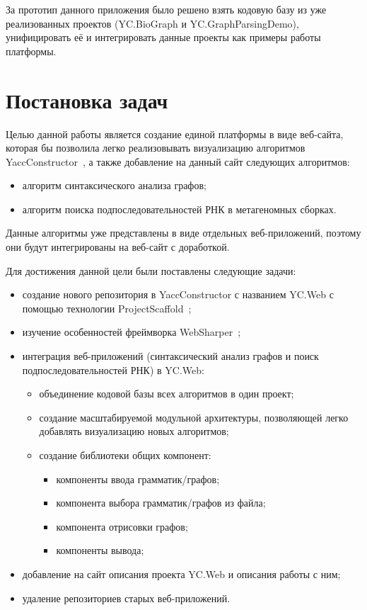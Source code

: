 \documentclass[14pt]{matmex-diploma}
\begin{document}
За прототип данного приложения было решено взять кодовую базу из уже реализованных проектов (YC.BioGraph и YC.GraphParsingDemo), унифицировать её и интегрировать данные проекты как примеры работы платформы.


\section{Постановка задач}
Целью данной работы является создание единой платформы в виде веб-сайта, которая бы позволила легко реализовывать визуализацию алгоритмов YaccConstructor~\cite{yacconstructor}, а также добавление на данный сайт следующих алгоритмов: 

\begin{itemize}
\item алгоритм синтаксического анализа графов; 
\item алгоритм поиска подпоследовательностей РНК в метагеномных сборках. 
\end{itemize}

Данные алгоритмы уже представлены в виде отдельных \linebreak веб-приложений, поэтому они будут интегрированы на веб-сайт с доработкой. 


Для достижения данной цели были поставлены следующие задачи: 
\begin{itemize}
\item создание нового репозитория в YaccConstructor с названием 
    \linebreak  YC.Web с помощью технологии ProjectScaffold~\cite{prscaffold};
\item изучение особенностей фреймворка WebSharper~\cite{websharper};
\item интеграция веб-приложений (синтаксический анализ графов и поиск подпоследовательностей РНК) в YC.Web: 
    \begin{itemize}
    \item объединение кодовой базы всех алгоритмов в один проект;
    \item создание масштабируемой модульной архитектуры, позволяющей легко добавлять визуализацию новых алгоритмов;
    \item создание библиотеки общих компонент:
        \begin{itemize}
        \item компоненты ввода грамматик/графов;
        \item компонента выбора грамматик/графов из файла;
        \item компонента отрисовки графов;
        \item компоненты вывода;
        \end{itemize}
    \end{itemize}
\item добавление на сайт описания проекта YC.Web и описания работы с ним;
\item удаление репозиториев старых веб-приложений.
\end{itemize}
\end{document}
